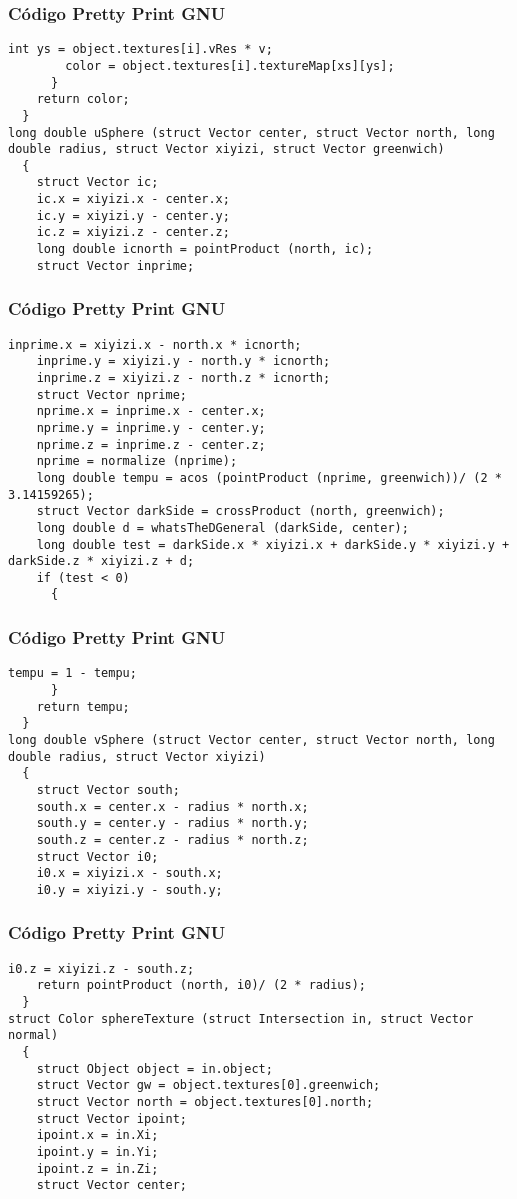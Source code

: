 \documentclass{beamer}
\begin{document}
\begin{frame}[fragile]
\frametitle{C\'odigo Pretty Print GNU}
\begin{lstlisting}[style=CStyle]
        int ys = object.textures[i].vRes * v;
        color = object.textures[i].textureMap[xs][ys];
      }
    return color;
  }
long double uSphere (struct Vector center, struct Vector north, long double radius, struct Vector xiyizi, struct Vector greenwich)
  {
    struct Vector ic;
    ic.x = xiyizi.x - center.x;
    ic.y = xiyizi.y - center.y;
    ic.z = xiyizi.z - center.z;
    long double icnorth = pointProduct (north, ic);
    struct Vector inprime;
\end{lstlisting}
\end{frame}
\begin{frame}[fragile]
\frametitle{C\'odigo Pretty Print GNU}
\begin{lstlisting}[style=CStyle]
    inprime.x = xiyizi.x - north.x * icnorth;
    inprime.y = xiyizi.y - north.y * icnorth;
    inprime.z = xiyizi.z - north.z * icnorth;
    struct Vector nprime;
    nprime.x = inprime.x - center.x;
    nprime.y = inprime.y - center.y;
    nprime.z = inprime.z - center.z;
    nprime = normalize (nprime);
    long double tempu = acos (pointProduct (nprime, greenwich))/ (2 * 3.14159265);
    struct Vector darkSide = crossProduct (north, greenwich);
    long double d = whatsTheDGeneral (darkSide, center);
    long double test = darkSide.x * xiyizi.x + darkSide.y * xiyizi.y + darkSide.z * xiyizi.z + d;
    if (test < 0)
      {
        \end{lstlisting}
\end{frame}
\begin{frame}[fragile]
\frametitle{C\'odigo Pretty Print GNU}
\begin{lstlisting}[style=CStyle]
        tempu = 1 - tempu;
      }
    return tempu;
  }
long double vSphere (struct Vector center, struct Vector north, long double radius, struct Vector xiyizi)
  {
    struct Vector south;
    south.x = center.x - radius * north.x;
    south.y = center.y - radius * north.y;
    south.z = center.z - radius * north.z;
    struct Vector i0;
    i0.x = xiyizi.x - south.x;
    i0.y = xiyizi.y - south.y;
\end{lstlisting}
\end{frame}
\begin{frame}[fragile]
\frametitle{C\'odigo Pretty Print GNU}
\begin{lstlisting}[style=CStyle]
    i0.z = xiyizi.z - south.z;
    return pointProduct (north, i0)/ (2 * radius);
  }
struct Color sphereTexture (struct Intersection in, struct Vector normal)
  {
    struct Object object = in.object;
    struct Vector gw = object.textures[0].greenwich;
    struct Vector north = object.textures[0].north;
    struct Vector ipoint;
    ipoint.x = in.Xi;
    ipoint.y = in.Yi;
    ipoint.z = in.Zi;
    struct Vector center;
\end{lstlisting}
\end{frame}
\end{document}
